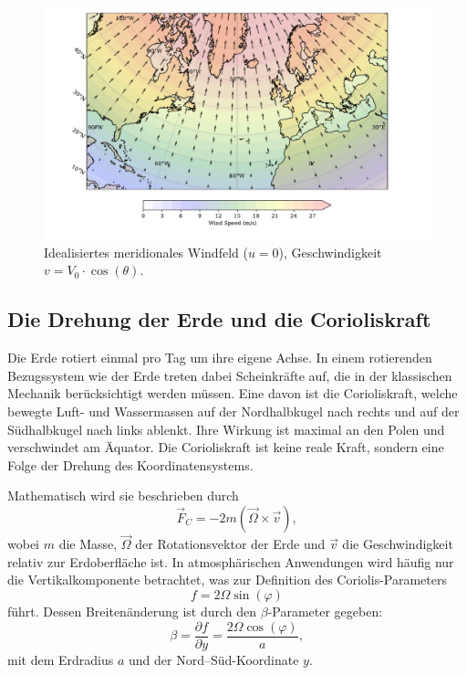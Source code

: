 \begin{figure}
	\centering
	\includegraphics[width=\textwidth, trim=1cm 0cm 2cm 0cm, clip]{papers/rossby/images/meridional_wind_plot.pdf}
	\caption{Idealisiertes meridionales Windfeld (\(u=0\)), Geschwindigkeit \(v = V_0 \cdot \cos(\theta)\).}
	\label{fig:meridional_wind}
\end{figure}

\subsection{Die Drehung der Erde und die Corioliskraft}

Die Erde rotiert einmal pro Tag um ihre eigene Achse. In einem rotierenden
Bezugssystem wie der Erde treten dabei Scheinkräfte auf, die in der klassischen
Mechanik berücksichtigt werden müssen. Eine davon ist die {Corioliskraft},
welche bewegte Luft- und Wassermassen auf der {Nordhalbkugel} nach rechts und
auf der {Südhalbkugel} nach links ablenkt. Ihre Wirkung ist maximal an den
Polen und verschwindet am Äquator. Die Corioliskraft ist keine reale Kraft,
sondern eine Folge der Drehung des Koordinatensystems.

Mathematisch wird sie beschrieben durch
\begin{equation}
	\vec{F}_C = -2m(\vec{\Omega} \times \vec{v}),
	\label{rossby:eq:coriolis_force}
\end{equation}
wobei \(m\) die Masse, \(\vec{\Omega}\) der Rotationsvektor der Erde und \(\vec{v}\) die Geschwindigkeit relativ zur Erdoberfläche ist. In atmosphärischen Anwendungen wird häufig nur die Vertikalkomponente betrachtet, was zur Definition des {Coriolis-Parameters}
\begin{equation}
	f = 2\Omega \sin(\varphi)
	\label{rossby:eq:coriolis_parameter}
\end{equation}
führt. Dessen Breitenänderung ist durch den \(\beta\)-Parameter gegeben:
\begin{equation}
	\beta = \frac{\partial f}{\partial y} = \frac{2 \Omega \cos(\varphi)}{a},
	\label{rossby:eq:beta_parameter}
\end{equation}
mit dem Erdradius \(a\) und der Nord–Süd-Koordinate \(y\).

